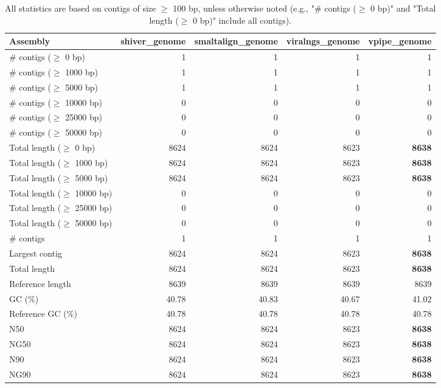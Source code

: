 \documentclass[12pt,a4paper]{article}
\begin{document}
\begin{table}[ht]
\begin{center}
\caption{All statistics are based on contigs of size $\geq$ 100 bp, unless otherwise noted (e.g., "\# contigs ($\geq$ 0 bp)" and "Total length ($\geq$ 0 bp)" include all contigs).}
\begin{tabular}{|l*{4}{|r}|}
\hline
Assembly & shiver\_genome & smaltalign\_genome & viralngs\_genome & vpipe\_genome \\ \hline
\# contigs ($\geq$ 0 bp) & 1 & 1 & 1 & 1 \\ \hline
\# contigs ($\geq$ 1000 bp) & 1 & 1 & 1 & 1 \\ \hline
\# contigs ($\geq$ 5000 bp) & 1 & 1 & 1 & 1 \\ \hline
\# contigs ($\geq$ 10000 bp) & 0 & 0 & 0 & 0 \\ \hline
\# contigs ($\geq$ 25000 bp) & 0 & 0 & 0 & 0 \\ \hline
\# contigs ($\geq$ 50000 bp) & 0 & 0 & 0 & 0 \\ \hline
Total length ($\geq$ 0 bp) & 8624 & 8624 & 8623 & {\bf 8638} \\ \hline
Total length ($\geq$ 1000 bp) & 8624 & 8624 & 8623 & {\bf 8638} \\ \hline
Total length ($\geq$ 5000 bp) & 8624 & 8624 & 8623 & {\bf 8638} \\ \hline
Total length ($\geq$ 10000 bp) & 0 & 0 & 0 & 0 \\ \hline
Total length ($\geq$ 25000 bp) & 0 & 0 & 0 & 0 \\ \hline
Total length ($\geq$ 50000 bp) & 0 & 0 & 0 & 0 \\ \hline
\# contigs & 1 & 1 & 1 & 1 \\ \hline
Largest contig & 8624 & 8624 & 8623 & {\bf 8638} \\ \hline
Total length & 8624 & 8624 & 8623 & {\bf 8638} \\ \hline
Reference length & 8639 & 8639 & 8639 & 8639 \\ \hline
GC (\%) & 40.78 & 40.83 & 40.67 & 41.02 \\ \hline
Reference GC (\%) & 40.78 & 40.78 & 40.78 & 40.78 \\ \hline
N50 & 8624 & 8624 & 8623 & {\bf 8638} \\ \hline
NG50 & 8624 & 8624 & 8623 & {\bf 8638} \\ \hline
N90 & 8624 & 8624 & 8623 & {\bf 8638} \\ \hline
NG90 & 8624 & 8624 & 8623 & {\bf 8638} \\ \hline

\end{tabular}
\end{center}
\end{table}
\end{document}
